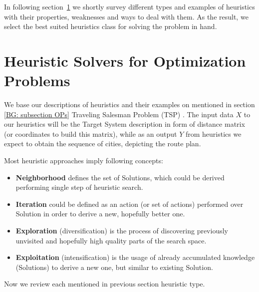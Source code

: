 In following section~\ref{bg: heuristics section} we shortly survey different types and examples of heuristics with their properties, weaknesses and ways to deal with them. As the result, we select the best suited heuristics class for solving the problem in hand.


\section{Heuristic Solvers for Optimization Problems}\label{bg: heuristics section}
We base our descriptions of heuristics and their examples on mentioned in section \ref{BG: subsection OPs} Traveling Salesman Problem (TSP) \cite{applegate2006traveling}. The input data $X$ to our heuristics will be the Target System description in form of distance matrix (or coordinates to build this matrix), while as an output $Y$ from heuristics we expect to obtain the sequence of cities, depicting the route plan.


Most heuristic approaches imply following concepts:
\begin{itemize}[itemsep=8pt]
	\item \textbf{Neighborhood} defines the set of Solutions, which could be derived performing single step of heuristic search.
	\item \textbf{Iteration} could be defined as an action (or set of actions) performed over Solution in order to derive a new, hopefully better one.
	\item \textbf{Exploration} (diversification) is the process of discovering previously unvisited and hopefully high quality parts of the search space.
	\item \textbf{Exploitation} (intensification) is the usage of already accumulated knowledge (Solutions) to derive a new one, but similar to existing Solution.
\end{itemize}


Now we review each mentioned in previous section heuristic type.


